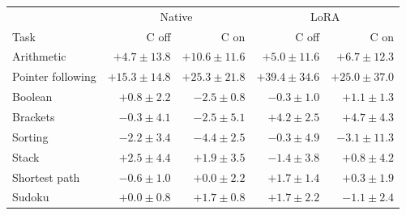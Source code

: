 \begin{tabular}{@{}lrrrr@{}}
\toprule
 & \multicolumn{2}{c}{Native} & \multicolumn{2}{c}{LoRA}\\
Task & C off & C on & C off & C on\\
\midrule
Arithmetic & $+4.7 \pm 13.8$ & $+10.6 \pm 11.6$ & $+5.0 \pm 11.6$ & $+6.7 \pm 12.3$\\
Pointer following & $+15.3 \pm 14.8$ & $+25.3 \pm 21.8$ & $+39.4 \pm 34.6$ & $+25.0 \pm 37.0$\\
Boolean & $+0.8 \pm 2.2$ & $-2.5 \pm 0.8$ & $-0.3 \pm 1.0$ & $+1.1 \pm 1.3$\\
Brackets & $-0.3 \pm 4.1$ & $-2.5 \pm 5.1$ & $+4.2 \pm 2.5$ & $+4.7 \pm 4.3$\\
Sorting & $-2.2 \pm 3.4$ & $-4.4 \pm 2.5$ & $-0.3 \pm 4.9$ & $-3.1 \pm 11.3$\\
Stack & $+2.5 \pm 4.4$ & $+1.9 \pm 3.5$ & $-1.4 \pm 3.8$ & $+0.8 \pm 4.2$\\
Shortest path & $-0.6 \pm 1.0$ & $+0.0 \pm 2.2$ & $+1.7 \pm 1.4$ & $+0.3 \pm 1.9$\\
Sudoku & $+0.0 \pm 0.8$ & $+1.7 \pm 0.8$ & $+1.7 \pm 2.2$ & $-1.1 \pm 2.4$\\
\bottomrule
\end{tabular}
